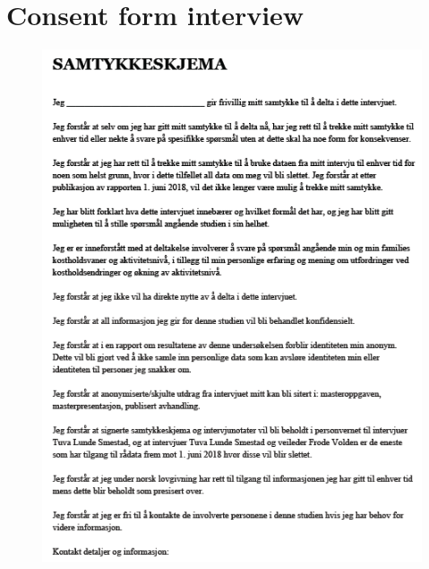     
\section{Consent form interview}
    \label{consentinterview}
    
  \begin{figure}[H]
        \centering
        \includegraphics[scale=0.8]{figures/samtykkeside1.png}
    \end{figure}
